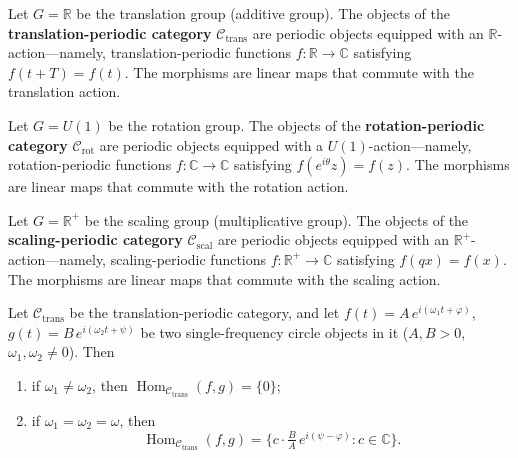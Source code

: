 \begin{definition}\label{def:translation_periodic_category}
Let $G = \mathbb{R}$ be the translation group (additive group). The objects of the \textbf{translation-periodic category} $\mathcal{C}_{\text{trans}}$ are periodic objects equipped with an $\mathbb{R}$-action---namely, translation-periodic functions $f: \mathbb{R} \to \mathbb{C}$ satisfying $f(t+T) = f(t)$. The morphisms are linear maps that commute with the translation action.
\end{definition}

\begin{definition}\label{def:rotation_periodic_category}
Let $G = U(1)$ be the rotation group. The objects of the \textbf{rotation-periodic category} $\mathcal{C}_{\text{rot}}$ are periodic objects equipped with a $U(1)$-action---namely, rotation-periodic functions $f: \mathbb{C} \to \mathbb{C}$ satisfying $f(e^{i\theta}z) = f(z)$. The morphisms are linear maps that commute with the rotation action.
\end{definition}

\begin{definition}\label{def:scaling_periodic_category}
Let $G = \mathbb{R}^+$ be the scaling group (multiplicative group). The objects of the \textbf{scaling-periodic category} $\mathcal{C}_{\text{scal}}$ are periodic objects equipped with an $\mathbb{R}^+$-action---namely, scaling-periodic functions $f: \mathbb{R}^+ \to \mathbb{C}$ satisfying $f(qx) = f(x)$. The morphisms are linear maps that commute with the scaling action.
\end{definition}

\begin{lemma}\label{ch13_hom_frequency_lemma}
Let $\mathcal{C}_{\text{trans}}$ be the translation-periodic category, and let $f(t) = A\, e^{i(\omega_1 t + \varphi)}$, $g(t) = B\, e^{i(\omega_2 t + \psi)}$ be two single-frequency circle objects in it ($A, B > 0$, $\omega_1, \omega_2 \neq 0$). Then
\begin{enumerate}[label=(\roman*)]
    \item if $\omega_1 \neq \omega_2$, then $\operatorname{Hom}_{\mathcal{C}_{\text{trans}}}(f, g) = \{0\}$;
    \item if $\omega_1 = \omega_2 = \omega$, then
    \[
    \operatorname{Hom}_{\mathcal{C}_{\text{trans}}}(f, g) = \Big\{ c \cdot \tfrac{B}{A}\, e^{i(\psi - \varphi)} : c \in \mathbb{C} \Big\}.
    \]
\end{enumerate}
\end{lemma}

